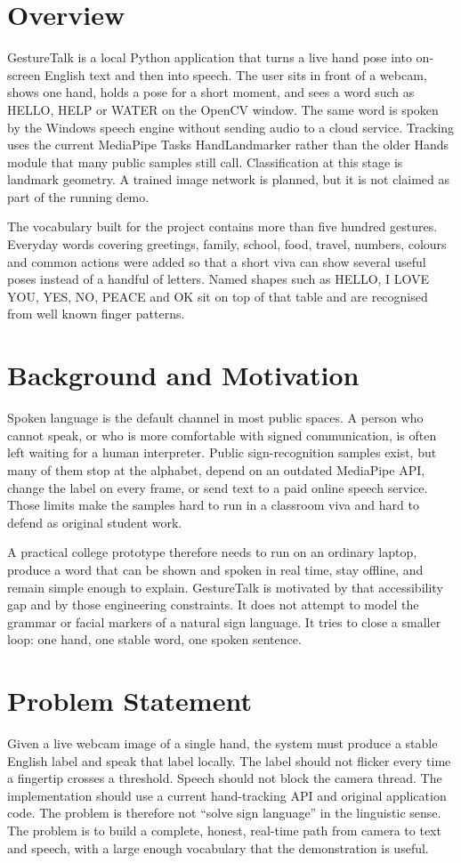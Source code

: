 \section{Overview}
GestureTalk is a local Python application that turns a live hand pose into on-screen English text and then into speech. The user sits in front of a webcam, shows one hand, holds a pose for a short moment, and sees a word such as HELLO, HELP or WATER on the OpenCV window. The same word is spoken by the Windows speech engine without sending audio to a cloud service. Tracking uses the current MediaPipe Tasks HandLandmarker rather than the older Hands module that many public samples still call. Classification at this stage is landmark geometry. A trained image network is planned, but it is not claimed as part of the running demo.

The vocabulary built for the project contains more than five hundred gestures. Everyday words covering greetings, family, school, food, travel, numbers, colours and common actions were added so that a short viva can show several useful poses instead of a handful of letters. Named shapes such as HELLO, I LOVE YOU, YES, NO, PEACE and OK sit on top of that table and are recognised from well known finger patterns.

\section{Background and Motivation}
Spoken language is the default channel in most public spaces. A person who cannot speak, or who is more comfortable with signed communication, is often left waiting for a human interpreter. Public sign-recognition samples exist, but many of them stop at the alphabet, depend on an outdated MediaPipe API, change the label on every frame, or send text to a paid online speech service. Those limits make the samples hard to run in a classroom viva and hard to defend as original student work.

A practical college prototype therefore needs to run on an ordinary laptop, produce a word that can be shown and spoken in real time, stay offline, and remain simple enough to explain. GestureTalk is motivated by that accessibility gap and by those engineering constraints. It does not attempt to model the grammar or facial markers of a natural sign language. It tries to close a smaller loop: one hand, one stable word, one spoken sentence.

\section{Problem Statement}
Given a live webcam image of a single hand, the system must produce a stable English label and speak that label locally. The label should not flicker every time a fingertip crosses a threshold. Speech should not block the camera thread. The implementation should use a current hand-tracking API and original application code. The problem is therefore not ``solve sign language'' in the linguistic sense. The problem is to build a complete, honest, real-time path from camera to text and speech, with a large enough vocabulary that the demonstration is useful.


